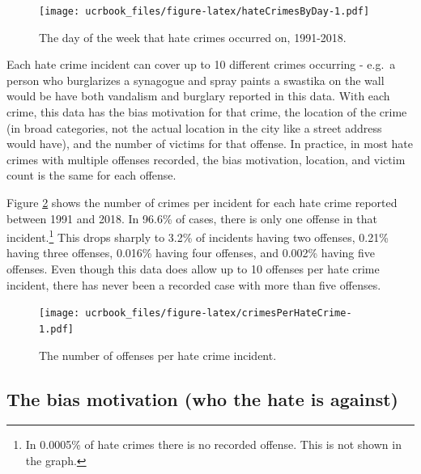 \documentclass[
  12pt,
  openany]{book}
\begin{document}
\begin{figure}
\centering
\texttt{[image: ucrbook\_files/figure-latex/hateCrimesByDay-1.pdf]}
\caption{\label{fig:hateCrimesByDay}The day of the week that hate crimes occurred on, 1991-2018.}
\end{figure}

Each hate crime incident can cover up to 10 different crimes occurring - e.g.~a person who burglarizes a synagogue and spray paints a swastika on the wall would be have both vandalism and burglary reported in this data. With each crime, this data has the bias motivation for that crime, the location of the crime (in broad categories, not the actual location in the city like a street address would have), and the number of victims for that offense. In practice, in most hate crimes with multiple offenses recorded, the bias motivation, location, and victim count is the same for each offense.

Figure \ref{fig:crimesPerHateCrime} shows the number of crimes per incident for each hate crime reported between 1991 and 2018. In 96.6\% of cases, there is only one offense in that incident.\footnote{In 0.0005\% of hate crimes there is no recorded offense. This is not shown in the graph.} This drops sharply to 3.2\% of incidents having two offenses, 0.21\% having three offenses, 0.016\% having four offenses, and 0.002\% having five offenses. Even though this data does allow up to 10 offenses per hate crime incident, there has never been a recorded case with more than five offenses.

\begin{figure}
\centering
\texttt{[image: ucrbook\_files/figure-latex/crimesPerHateCrime-1.pdf]}
\caption{\label{fig:crimesPerHateCrime}The number of offenses per hate crime incident.}
\end{figure}

\hypertarget{the-bias-motivation-who-the-hate-is-against}{%
\subsection{The bias motivation (who the hate is against)}\label{the-bias-motivation-who-the-hate-is-against}}
\end{document}
